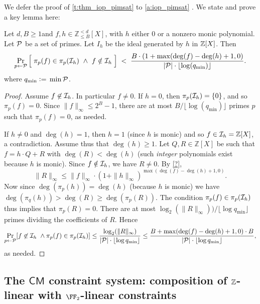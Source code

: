 \documentclass[11pt,letterpaper,usenames,dvipsnames]{article}
\begin{document}
We defer the proof of \cref{t:thm_iop_pimsat} to \cref{a:iop_pimsat} . We state and prove a key lemma here:
\begin{lemma}\label{lem:ideals_modular projection}
Let $d,B\ge 1$and $f,h\in\mathbb{Z}_{\leq B}^{<d}[X]$, with $h$ either $0$ or a nonzero monic polynomial. Let $\mathcal{P}$ be a set of primes. Let $I_h$ be the ideal generated by $h$ in $\mathbb{Z}[X]$. Then
%
\[
\Pr_{p\leftarrow\mathcal{P}}
\Big[\;\pi_p(f)\in \pi_p(\mathcal{I}_h)\ \wedge\ f\notin \mathcal{I}_h\;\Big]
\;<\;\frac{B\cdot (1 +\max(\deg(f)-\deg(h)+1,0)}{|\mathcal{P}|\cdot \lfloor\log(q_{\min})\rfloor}.
\]
where $q_{\min}{\;\vcentcolon=\;} \min \mathcal{P}$.
\end{lemma}
\begin{proof}
Assume  $f\not\in\mathcal{I}_h$. In particular
$f\neq 0$. 
 If $h=0$, then  $\pi_p(\mathcal{I}_h)=\{0\}$, and so
 $\pi_p(f)=0$. Since $\|f\|_\infty\leq 2^{B}-1$, there are at most $B/\lfloor \log(q_{\min})\rfloor$ primes $p$ such that $\pi_p(f)=0$, as needed.

If $h\neq0$ and $\deg(h)=1$, then $h=1$ (since $h$ is monic) and so $f\in\mathcal{I}_h=\mathbb{Z}[X]$, a contradiction. Assume thus that $\deg(h)\geq 1$. Let $Q,R\in\mathbb{Z}[X]$ be such that
$f=h\cdot Q+R$ with $\deg(R)<\deg(h)$ (such \emph{integer} polynomials exist because $h$ is monic). Since
$f\notin\mathcal{I}_h$, we have $R\neq0$.
By \cref{?}, $$\|R\|_\infty \le\|f\|_\infty\cdot (1 +\|h\|_\infty)^{\max(\deg(f) - \deg(h) +1,0)}.$$ 
Now since $\deg(\pi_p(h))=\deg(h)$ (because $h$ is monic) we have $ \deg(\pi_q(h))> \deg(R)\geq \deg(\pi_p(R))$.  The condition $\pi_p(f)\in \pi_p(\mathcal{I}_h)$ thus implies that $\pi_p(R)=0$.  There are at most $\log_2(\|R\|_\infty))/\lfloor \log q_{\min} \rfloor$ primes dividing the coefficients of $R$. Hence
%
$$\Pr_{p\gets \cP}[f\not\in \ideal_h \ \wedge \pi_p(f)\in \pi_p(\ideal_h)] \leq \frac{\log_2(\|R\|_\infty)}{|\cP|\cdot \lfloor \log q_{\min} \rfloor} \leq \frac{B + \max(\deg(f)-\deg(h)+1,0)\cdot B}{|\cP|\cdot \lfloor \log q_{\min}\rfloor},$$
as needed.
%
\end{proof}




\label{s:univ_skip_ideal_membership}


\subsection{The $\mathsf{CM}$ constraint system: composition of  $\mathbb{Z}$-linear  with $\FF_2$-linear constraints}
\end{document}

